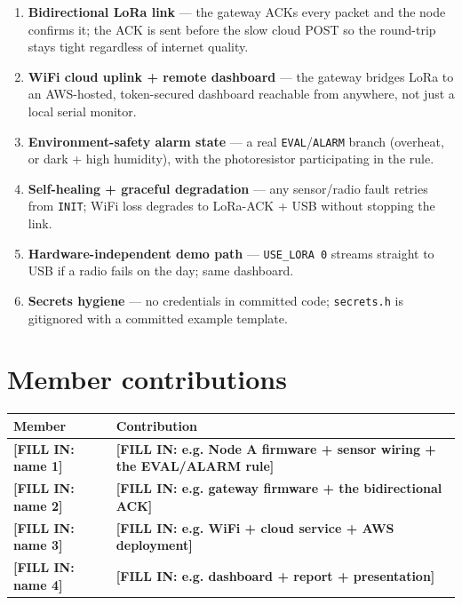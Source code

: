 \documentclass[11pt,a4paper]{article}
\newcommand{\fillin}[1]{{\color{okfg}\textbf{[FILL IN: #1]}}}
\begin{document}
\begin{enumerate}
\item \textbf{Bidirectional LoRa link} --- the gateway ACKs every packet
and the node confirms it; the ACK is sent before the slow cloud POST so
the round-trip stays tight regardless of internet quality.
\item \textbf{WiFi cloud uplink + remote dashboard} --- the gateway
bridges LoRa to an AWS-hosted, token-secured dashboard reachable from
anywhere, not just a local serial monitor.
\item \textbf{Environment-safety alarm state} --- a real
\texttt{EVAL}/\texttt{ALARM} branch (overheat, or dark + high humidity),
with the photoresistor participating in the rule.
\item \textbf{Self-healing + graceful degradation} --- any sensor/radio
fault retries from \texttt{INIT}; WiFi loss degrades to LoRa-ACK + USB
without stopping the link.
\item \textbf{Hardware-independent demo path} --- \texttt{USE\_LORA 0}
streams straight to USB if a radio fails on the day; same dashboard.
\item \textbf{Secrets hygiene} --- no credentials in committed code;
\texttt{secrets.h} is gitignored with a committed example template.
\end{enumerate}

\section{Member contributions}

\begin{center}\begin{tabular}{@{}lp{9cm}@{}}
\toprule
\textbf{Member} & \textbf{Contribution}\\
\midrule
\fillin{name 1} & \fillin{e.g. Node A firmware + sensor wiring + the EVAL/ALARM rule}\\
\fillin{name 2} & \fillin{e.g. gateway firmware + the bidirectional ACK}\\
\fillin{name 3} & \fillin{e.g. WiFi + cloud service + AWS deployment}\\
\fillin{name 4} & \fillin{e.g. dashboard + report + presentation}\\
\bottomrule
\end{tabular}\end{center}
\end{document}
